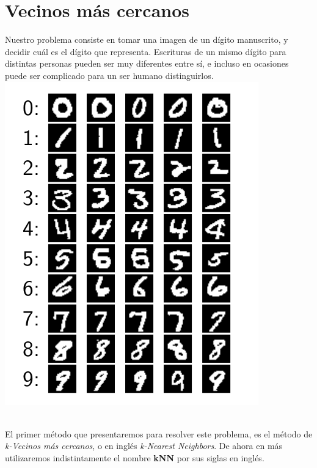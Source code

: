 \section{Vecinos más cercanos}


Nuestro problema consiste en tomar una imagen de un dígito manuscrito, y decidir cuál es el dígito que representa. Escrituras de un mismo dígito para distintas personas pueden ser muy diferentes entre sí, e incluso en ocasiones puede ser complicado para un ser humano distinguirlos. \\

{\centering
    \includegraphics[scale=0.40]{informe/imagenes/knn/muestraVariaciones.png} \\
}
$ $\newline

El primer método que presentaremos para resolver este problema, es el método de \textit{k-Vecinos más cercanos}, o en inglés \textit{k-Nearest Neighbors}. De ahora en más utilizaremos indistintamente el nombre \textbf{kNN} por sus siglas en inglés. \\

